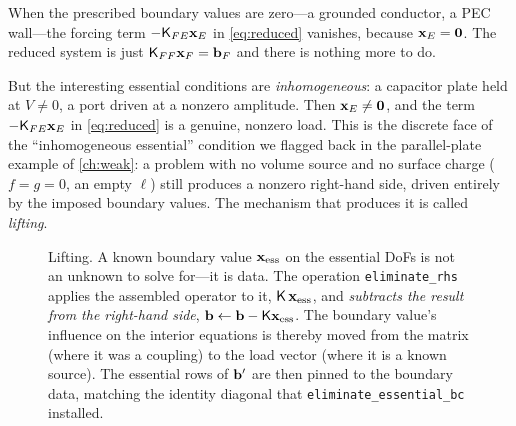 When the prescribed boundary values are zero---a grounded conductor, a PEC
wall---the forcing term $-\mathsf{K}_{FE}\mathbf{x}_E$ in \cref{eq:reduced} vanishes,
because $\mathbf{x}_E=\mathbf{0}$. The reduced system is just
$\mathsf{K}_{FF}\mathbf{x}_F=\mathbf{b}_F$ and there is nothing more to do.

But the interesting essential conditions are \emph{inhomogeneous}: a capacitor
plate held at $V\neq 0$, a port driven at a nonzero amplitude. Then $\mathbf{x}_E\neq
\mathbf{0}$, and the term $-\mathsf{K}_{FE}\mathbf{x}_E$ in \cref{eq:reduced} is a genuine,
nonzero load. This is the discrete face of the ``inhomogeneous essential''
condition we flagged back in the parallel-plate example of \cref{ch:weak}: a
problem with no volume source and no surface charge ($f=g=0$, an empty $\ell$)
still produces a nonzero right-hand side, driven entirely by the imposed
boundary values. The mechanism that produces it is called \emph{lifting}.

\begin{figure}[t]
\centering
{}
\caption[Lifting an inhomogeneous Dirichlet condition into the RHS]{Lifting. A
known boundary value $\mathbf{x}_{\mathrm{ess}}$ on the essential DoFs is not an unknown
to solve for---it is data. The operation \texttt{eliminate\_rhs} applies the
assembled operator to it, $\mathsf{K}\,\mathbf{x}_{\mathrm{ess}}$, and \emph{subtracts the
result from the right-hand side}, $\mathbf{b}\leftarrow\mathbf{b}-\mathsf{K}\mathbf{x}_{\mathrm{ess}}$.
The boundary value's influence on the interior equations is thereby moved from the
matrix (where it was a coupling) to the load vector (where it is a known source).
The essential rows of $\mathbf{b}'$ are then pinned to the boundary data, matching the
identity diagonal that \texttt{eliminate\_essential\_bc} installed.}
\label{fig:lifting}
\end{figure}

